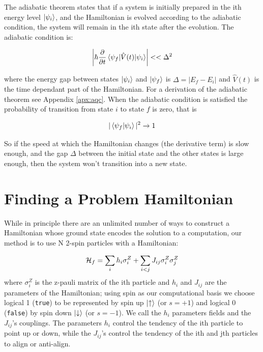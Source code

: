 The adiabatic theorem states that if a system is initially prepared in the ith energy level $\mathinner{|{\psi_i}\rangle}$, and the Hamiltonian is evolved according to the adiabatic condition, the system will remain in the ith state after the evolution.  The adiabatic condition is:

\begin{equation}
	\left | \hbar\frac{\partial}{\partial t} \mathinner{\langle{\psi_f | \hat{V}(t) | \psi_i}\rangle} \right | << \Delta^2
\end{equation}

where the energy gap between states $\mathinner{|{\psi_i}\rangle}$ and $\mathinner{|{\psi_f}\rangle}$ is $\Delta = |E_f - E_i|$ and $\hat{V}(t)$ is the time dependant part of the Hamiltonian.  For a derivation of the adiabatic theorem see Appendix \ref{apx:aqc}.  When the adiabatic condition is satisfied the probability of transition from state $i$ to state $f$ is zero, that is

\begin{equation}
	|\mathinner{\langle{\psi_f|\psi_i}\rangle}|^2 \rightarrow 1
\end{equation}

So if the speed at which the Hamiltonian changes (the derivative term) is slow enough, and the gap $\Delta$ between the initial state and the other states is large enough, then the system won't transition into a new state.

\section{Finding a Problem Hamiltonian}
\label{sec:prob_ham}
While in principle there are an unlimited number of ways to construct a Hamiltonian whose ground state encodes the solution to a computation, our method is to use N 2-spin particles with a Hamiltonian:

\begin{equation}
	\label{eq:ham}
	\mathcal{H}_f = \sum_i h_i \sigma_i^Z + \sum_{i < j} J_{ij} \sigma_i^Z\sigma_j^Z 
\end{equation}
where $\sigma_i^Z$ is the z-pauli matrix of the ith particle and $h_i$ and $J_{ij}$ are the parameters of the Hamiltonian; using spin as our computational basis we choose logical 1 (\texttt{true}) to be represented by spin up $\mathinner{|{\uparrow}\rangle}$ (or $s = +1$) and logical 0 (\texttt{false}) by spin down $\mathinner{|{\downarrow}\rangle}$ (or $s = -1$).  We call the $h_i$ parameters fields and the $J_{ij}$'s couplings.  The parameters $h_i$ control the tendency of the ith particle to point up or down, while the $J_{ij}$'s control the tendency of the ith and jth particles to align or anti-align.

